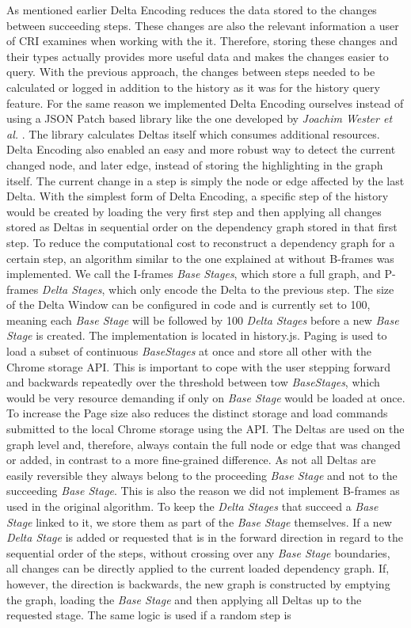 As mentioned earlier Delta Encoding reduces the data stored to the changes between succeeding steps. These changes are also the relevant information a user of CRI examines when working with the it. Therefore, storing these changes and their types actually provides more useful data and makes the changes easier to query. With the previous approach, the changes between steps needed to be calculated or logged in addition to the history as it was for the history query feature. For the same reason we implemented Delta Encoding ourselves instead of using a JSON Patch \cite{JSONPatch} based library like the one developed by \emph{Joachim Wester et al.} \cite{JSONPatchImplementation}. The library calculates Deltas itself which consumes additional resources. Delta Encoding also enabled an easy and more robust way to detect the current changed node, and later edge, instead of storing the highlighting in the graph itself. The current change in a step is simply the node or edge affected by the last Delta. With the simplest form of Delta Encoding, a specific step of the history would be created by loading the very first step and then applying all changes stored as Deltas in sequential order on the dependency graph stored in that first step. To reduce the computational cost to reconstruct a dependency graph for a certain step, an algorithm similar to the one explained at \cite{VideoEncoding} without B-frames was implemented. We call the I-frames \emph{Base Stages}, which store a full graph, and P-frames \emph{Delta Stages}, which only encode the Delta to the previous step. The size of the Delta Window can be configured in code and is currently set to 100, meaning each \emph{Base Stage} will be followed by 100 \emph{Delta Stages} before a new \emph{Base Stage} is created. The implementation is located in history.js. Paging is used to load a subset of continuous \emph{BaseStages} at once and store all other with the Chrome storage API. This is important to cope with the user stepping forward and backwards repeatedly over the threshold between tow \emph{BaseStages}, which would be very resource demanding if only on \emph{Base Stage} would be loaded at once. To increase the Page size also reduces the distinct storage and load commands submitted to the local Chrome storage using the API. The Deltas are used on the graph level and, therefore, always contain the full node or edge that was changed or added, in contrast to a more fine-grained difference. As not all Deltas are easily reversible they always belong to the proceeding \emph{Base Stage} and not to the succeeding \emph{Base Stage}. This is also the reason we did not implement B-frames as used in the original algorithm. To keep the \emph{Delta Stages} that succeed a \emph{Base Stage} linked to it, we store them as part of the \emph{Base Stage} themselves. If a new \emph{Delta Stage} is added or requested that is in the forward direction in regard to the sequential order of the steps, without crossing over any \emph{Base Stage} boundaries, all changes can be directly applied to the current loaded dependency graph. If, however, the direction is backwards, the new graph is constructed by emptying the graph, loading the \emph{Base Stage} and then applying all Deltas up to the requested stage. The same logic is used if a random step is 
